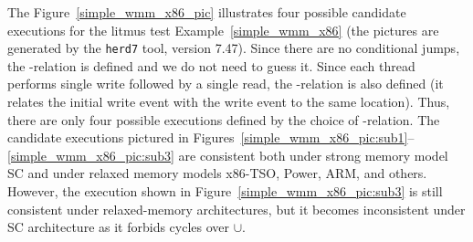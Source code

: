 The Figure~\ref{simple_wmm_x86_pic} illustrates four possible candidate executions for the litmus test Example~\ref{simple_wmm_x86} (the pictures are generated by the \texttt{herd7} tool, version 7.47). Since there are no conditional jumps, the \po-relation is defined and we do not need to guess it. Since each thread performs single write followed by a single read, the \co-relation is also defined (it relates the initial write event with the write event to the same location). Thus, there are only four possible executions defined by the choice of \rf-relation. The candidate executions pictured in Figures~\ref{simple_wmm_x86_pic:sub1}--\ref{simple_wmm_x86_pic:sub3} are consistent both under strong memory model SC and under relaxed memory models x86-TSO, Power, ARM, and others. However, the execution shown in Figure~\ref{simple_wmm_x86_pic:sub3} is still consistent under relaxed-memory architectures, but it becomes inconsistent under SC architecture as it forbids cycles over \fr$\cup$\po.

